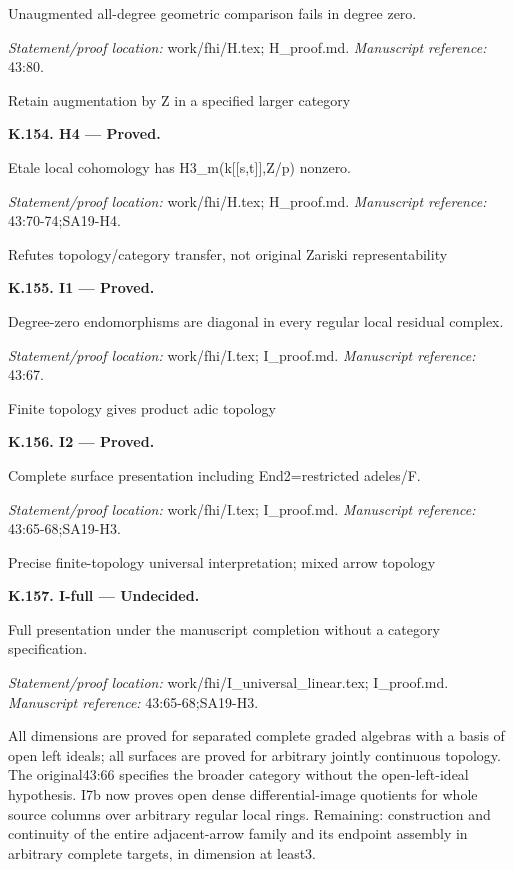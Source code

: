 Unaugmented all-degree geometric comparison fails in degree zero.
\par\emph{Statement/proof location:} work/fhi/H.tex; H\_proof.md.
\emph{Manuscript reference:} 43:80.
\par Retain augmentation by Z in a specified larger category
\par\medskip\noindent\textbf{K.154. H4 --- Proved.}\par
Etale local cohomology has H3\_m(k[[s,t]],Z/p) nonzero.
\par\emph{Statement/proof location:} work/fhi/H.tex; H\_proof.md.
\emph{Manuscript reference:} 43:70-74;SA19-H4.
\par Refutes topology/category transfer, not original Zariski representability
\par\medskip\noindent\textbf{K.155. I1 --- Proved.}\par
Degree-zero endomorphisms are diagonal in every regular local residual complex.
\par\emph{Statement/proof location:} work/fhi/I.tex; I\_proof.md.
\emph{Manuscript reference:} 43:67.
\par Finite topology gives product adic topology
\par\medskip\noindent\textbf{K.156. I2 --- Proved.}\par
Complete surface presentation including End2=restricted adeles/F.
\par\emph{Statement/proof location:} work/fhi/I.tex; I\_proof.md.
\emph{Manuscript reference:} 43:65-68;SA19-H3.
\par Precise finite-topology universal interpretation; mixed arrow topology
\par\medskip\noindent\textbf{K.157. I-full --- Undecided.}\par
Full presentation under the manuscript completion without a category specification.
\par\emph{Statement/proof location:} work/fhi/I\_universal\_linear.tex; I\_proof.md.
\emph{Manuscript reference:} 43:65-68;SA19-H3.
\par All dimensions are proved for separated complete graded algebras with a basis of open left ideals; all surfaces are proved for arbitrary jointly continuous topology. The original43:66 specifies the broader category without the open-left-ideal hypothesis. I7b now proves open dense differential-image quotients for whole source columns over arbitrary regular local rings. Remaining: construction and continuity of the entire adjacent-arrow family and its endpoint assembly in arbitrary complete targets, in dimension at least3.
